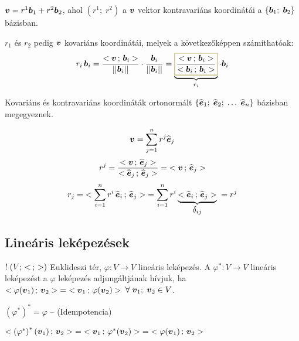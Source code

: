 \documentclass[main.tex]{subfiles}
\begin{document}
\vspace*{1.5em}
$\boldsymbol{v} = r^1 \boldsymbol{b}_1 + r^2 \boldsymbol{b}_2$, ahol
$(r^1 ; \; r^2)$ a $\boldsymbol{v}$ vektor kontravariáns koordinátái
a $\left\{ \boldsymbol{b}_1 ; \; \boldsymbol{b}_2 \right\}$ bázisban.

\vspace*{.5em}
$r_1$ és $r_2$ pedig $\boldsymbol{v}$ kovariáns koordinátái,
melyek a következőképpen számíthatóak:
\begin{equation*}
  r_i \, \rvec{b}_i = \frac{
    \scalar{\rvec{v}}{\rvec{b}_i}
  }{\norma{\rvec{b}_i}} \cdot \frac{
    \rvec{b}_i
  }{\norma{\rvec{b}_i}}
  = \underbrace{\rected{$\displaystyle\frac{
          \scalar{\rvec{v}}{\rvec{b}_i}
        }{\scalar{\rvec{b}_i}{\rvec{b}_i}}$}{yellow}}_{r_i}
  \cdot \rvec{b}_i
\end{equation*}



Kovariáns és kontravariáns koordináták ortonormált
$\left\{ \widehat{\boldsymbol{e}}_1 ; \; \widehat{\boldsymbol{e}}_2 ; \; \dots \; \widehat{\boldsymbol{e}}_n \right\}$
bázisban megegyeznek.


\begin{equation*}
  \boldsymbol{v} = \sum_{j=1}^n r^j \widehat{\boldsymbol{e}}_j
\end{equation*}
\begin{equation*}
  r^j = \dfrac{
    < \boldsymbol{v} \, ; \, \widehat{\boldsymbol{e}}_j >
  }{
    < \widehat{\boldsymbol{e}}_j \, ; \, \widehat{\boldsymbol{e}}_j >
  } = \; < \boldsymbol{v} \, ; \, \widehat{\boldsymbol{e}}_j >
\end{equation*}
\begin{equation*}
  r_j = \; < 
    \sum_{i=1}^n r^i \, \widehat{\boldsymbol{e}}_i
   \, ; \, \widehat{\boldsymbol{e}}_j > \; = \sum_{i=1}^n r^i \underbrace{
    < \widehat{\boldsymbol{e}}_i \, ; \, \widehat{\boldsymbol{e}}_j >
  }_{\displaystyle\delta_{ij}} \; = r^j
\end{equation*}

\subsection{Lineáris leképezések}


$! \; (V; \, <  \, ; \,  >)$ Euklideszi tér,
$\varphi: V \rightarrow V$ lineáris leképezés.
A $\varphi^{*} : V \rightarrow V$ lineáris leképezést
a $\varphi$ leképezés adjungáltjának hívjuk, ha
$< \varphi(\boldsymbol{v}_1) \, ; \, \boldsymbol{v}_2 >
  \; = \; < \boldsymbol{v}_1 \, ; \, \varphi(\boldsymbol{v}_2) >$
$\forall \; \boldsymbol{v}_1 ;\; \boldsymbol{v}_2 \in V$.

$\left( \varphi^{*} \right)^{*} = \varphi$
\hspace{2mm} – \hspace{2mm} (Idempotencia)

$< \left( \varphi^{*} \right)^{*}(\boldsymbol{v}_1) \, ; \, \boldsymbol{v}_2 >
  \; = \; < \boldsymbol{v}_1 \, ; \, \varphi^{*}(\boldsymbol{v}_2) >
  \; = \; < \varphi(\boldsymbol{v}_1) \, ; \, \boldsymbol{v}_2 >$
\end{document}
